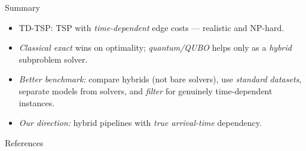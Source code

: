 \documentclass[
11pt,notheorems,hyperref={pdfauthor=Alma Arevalo Loyola}
]{beamer}
\renewcommand{\emphasize}[1]{\textcolor{emphasisblue}{\textit{#1}}}
\newcommand{\emphteal}[1]{\textcolor{emphasisteal}{\textit{#1}}}
\begin{document}
\begin{frame}{Summary}
  \begin{itemize}
    \item TD-TSP: TSP with \emphteal{time-dependent} edge costs --- realistic and NP-hard.
    \item \emphasize{Classical exact} wins on optimality; \emphasize{quantum/QUBO} helps only as a \emphasize{hybrid} subproblem solver.
    \item \emphasize{Better benchmark:} compare hybrids (not bare solvers), use \emphasize{standard datasets}, separate models from solvers, and \emphasize{filter} for genuinely time-dependent instances.
    \item \emphasize{Our direction:} hybrid pipelines with \emphasize{true arrival-time} dependency.
  \end{itemize}
\end{frame}

\begin{frame}[allowframebreaks]{References}
  \printbibliography
\end{frame}
\end{document}
